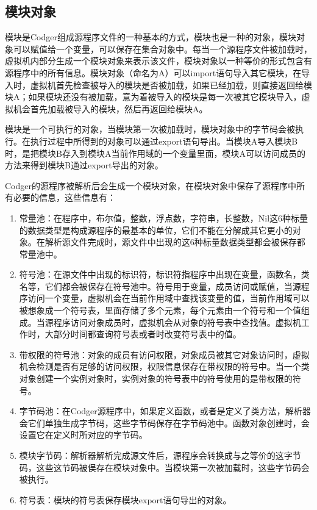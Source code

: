\subsection{模块对象}
模块是Codger组成源程序文件的一种基本的方式，模块也是一种的对象，模块对象可以赋值给一个变量，可以保存在集合对象中。每当一个源程序文件被加载时，虚拟机内部分生成一个模块对象来表示该文件，模块对象以一种等价的形式包含有源程序中的所有信息。模块对象（命名为A）可以import语句导入其它模块，在导入时，虚拟机首先检查被导入的模块是否被加载，如果已经加载，则直接返回给模块A；如果模块还没有被加载，意为着被导入的模块是每一次被其它模块导入，虚拟机会首先加载被导入的模块，然后再返回给模块A。

模块是一个可执行的对象，当模块第一次被加载时，模块对象中的字节码会被执行。在执行过程中所得到的对象可以通过export语句导出。当模块A导入模块B时，是把模块B存入到模块A当前作用域的一个变量里面，模块A可以访问成员的方法来得到模块B通过export导出的对象。

Codger的源程序被解析后会生成一个模块对象，在模块对象中保存了源程序中所有必要的信息，这些信息有：
\begin{enumerate}
\item 常量池：在程序中，布尔值，整数，浮点数，字符串，长整数，Nil这6种标量的数据类型是构成源程序的最基本的单位，它们不能在分解成其它更小的对象。在解析源文件完成时，源文件中出现的这6种标量数据类型都会被保存都常量池中。
\item 符号池：在源文件中出现的标识符，标识符指程序中出现在变量，函数名，类名等，它们都会被保存在符号池中。符号用于变量，成员访问或赋值，当源程序访问一个变量，虚拟机会在当前作用域中查找该变量的值，当前作用域可以被想象成一个符号表，里面存储了多个元素，每个元素由一个符号和一个值组成。当源程序访问对象成员时，虚拟机会从对象的符号表中查找值。虚拟机工作时，大部分时间都查询符号表或者时改变符号表中的值。
\item 带权限的符号池：对象的成员有访问权限，对象成员被其它对象访问时，虚拟机会检测是否有足够的访问权限，权限信息保存在带权限的符号中。当一个类对象创建一个实例对象时，实例对象的符号表中的符号使用的是带权限的符号。
\item 字节码池：在Codger源程序中，如果定义函数，或者是定义了类方法，解析器会它们单独生成字节码，这些字节码保存在字节码池中。函数对象创建时，会设置它在定义时所对应的字节码。
\item 模块字节码：解析器解析完成源文件后，源程序会转换成与之等价的这字节码，这些这节码被俣存在模块对象中。当模块第一次被加载时，这些字节码会被执行。
\item 符号表：模块的符号表保存模块export语句导出的对象。
\end{enumerate}
